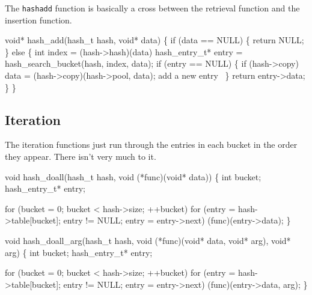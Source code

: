 \nwendcode{}\nwdocspar

The {\tt{}hash{}add} function is basically a cross between the retrieval
function and the insertion function.

\nwenddocs{}\plusendmoddef
void* hash_add(hash_t hash, void* data)
\{
    if (data == NULL) \{
        return NULL;
    \} else \{
        int index = (hash->hash)(data) %
        hash_entry_t* entry = hash_search_bucket(hash, index, data);
        if (entry == NULL) \{
            if (hash->copy)
                data = (hash->copy)(hash->pool, data);
            \LA{}add a new entry~{\nwtagstyle{}}\RA{}
        \} 
        return entry->data;
    \}
\}
\nwendcode{}\nwdocspar

\subsection{Iteration}

The iteration functions just run through the entries in each
bucket in the order they appear.  There isn't very much to it.

\nwenddocs{}\plusendmoddef
void hash_doall(hash_t hash, void (*func)(void* data))
\{
    int bucket;
    hash_entry_t* entry;

    for (bucket = 0; bucket < hash->size; ++bucket)
        for (entry = hash->table[bucket]; entry != NULL; entry = entry->next)
            (func)(entry->data);
\}

\nwendcode{}\nwdocspar

\nwenddocs{}\plusendmoddef
void hash_doall_arg(hash_t hash, void (*func)(void* data, void* arg),
                    void* arg)
\{
    int bucket;
    hash_entry_t* entry;

    for (bucket = 0; bucket < hash->size; ++bucket)
        for (entry = hash->table[bucket]; entry != NULL; entry = entry->next)
            (func)(entry->data, arg);
\}

\nwendcode{}\nwdocspar


